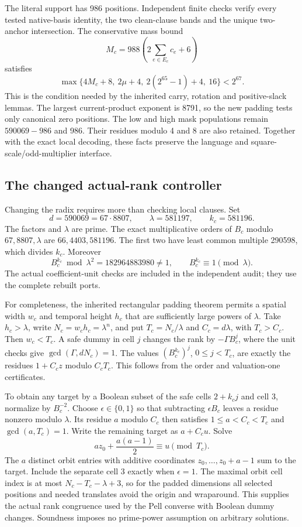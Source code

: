 \documentclass[11pt,letterpaper]{article}
\theoremstyle{definition}\newtheorem{definition}[theorem]{Definition}
\theoremstyle{remark}\newtheorem{remark}[theorem]{Remark}
\begin{document}
The literal support has 986 positions. Independent finite checks verify every tested native-basis identity, the two clean-clause bands and the unique two-anchor intersection. The conservative mass bound
\[
 M_c=988\left(2\sum_{e\in E_c}c_e+6\right)
\]
satisfies
\[
 \max\{4M_c+8,\ 2\mu+4,\ 2(2^{65}-1)+4,\ 16\}<2^{67}.
\]
This is the condition needed by the inherited carry, rotation and positive-slack lemmas. The largest current-product exponent is 8791, so the new padding tests only canonical zero positions. The low and high mask populations remain $590069-986$ and 986. Their residues modulo 4 and 8 are also retained. Together with the exact local decoding, these facts preserve the language and square-scale/odd-multiplier interface.

\subsection{The changed actual-rank controller}

Changing the radix requires more than checking local clauses. Set
\[
 d=590069=67\cdot8807,\qquad \lambda=581197,\qquad k_c=581196.
\]
The factors and $\lambda$ are prime. The exact multiplicative orders of $B_c$ modulo $67,8807,\lambda$ are $66,4403,581196$. The first two have least common multiple 290598, which divides $k_c$. Moreover
\[
 B_c^{k_c}\bmod\lambda^2=182964883980\ne1,
 \qquad B_c^{k_c}\equiv1\pmod\lambda.
\]
The actual coefficient-unit checks are included in the independent audit; they use the complete rebuilt ports.

For completeness, the inherited rectangular padding theorem permits a spatial width $w_c$ and temporal height $h_c$ that are sufficiently large powers of $\lambda$. Take $h_c>\lambda$, write $N_c=w_ch_c=\lambda^n$, and put $T_c=N_c/\lambda$ and $C_c=d\lambda$, with $T_c>C_c$. Then $w_c<T_c$. A safe dummy in cell $j$ changes the rank by $-\Gamma B_c^j$, where the unit checks give $\gcd(\Gamma,dN_c)=1$. The values $(B_c^{k_c})^j$, $0\le j<T_c$, are exactly the residues $1+C_cz$ modulo $C_cT_c$. This follows from the order and valuation-one certificates.

To obtain any target by a Boolean subset of the safe cells $2+k_cj$ and cell 3, normalize by $B_c^{-2}$. Choose $\epsilon\in\{0,1\}$ so that subtracting $\epsilon B_c$ leaves a residue nonzero modulo $\lambda$. Its residue $a$ modulo $C_c$ then satisfies $1\le a<C_c<T_c$ and $\gcd(a,T_c)=1$. Write the remaining target as $a+C_cu$. Solve
\[
 az_0+\frac{a(a-1)}2\equiv u\pmod{T_c}.
\]
The $a$ distinct orbit entries with additive coordinates $z_0,\ldots,z_0+a-1$ sum to the target. Include the separate cell 3 exactly when $\epsilon=1$. The maximal orbit cell index is at most $N_c-T_c-\lambda+3$, so for the padded dimensions all selected positions and needed translates avoid the origin and wraparound. This supplies the actual rank congruence used by the Pell converse with Boolean dummy changes. Soundness imposes no prime-power assumption on arbitrary solutions.
\end{document}

